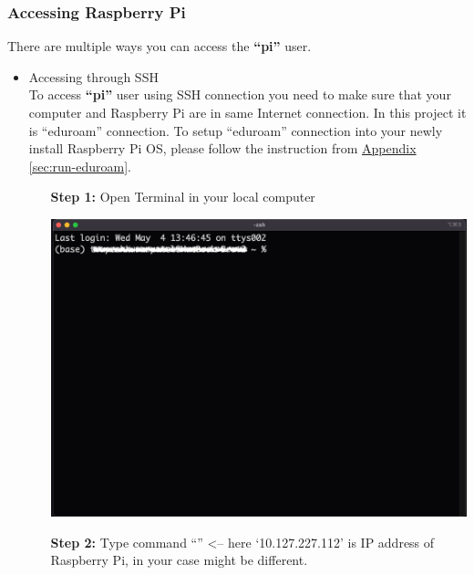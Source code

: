 	\subsubsection{Accessing Raspberry Pi}	\label{subsubsec:ssh}
		There are multiple ways you can access the \textbf{``pi''} user.  
		\begin{itemize}[leftmargin=1.2cm]
			\item Accessing through SSH \\
				To access \textbf{``pi''} user using SSH connection you need to make sure that your computer and Raspberry Pi are in same Internet connection. In this project it is ``eduroam'' connection. To setup ``eduroam'' connection into your newly install Raspberry Pi OS, please follow the instruction from \hyperref[sec:run-eduroam]{Appendix \ref{sec:run-eduroam}}.
				\begin{itemize}[leftmargin=1.3cm]
					\item[\textbf{Step 1:}] Open Terminal in your local computer \\
						\begin{minipage}{\textwidth}
							\vspace{2mm}
							\includegraphics[scale=0.18]{Images/raspberry_pi/ssh_login/open_iterm.png}
							\vspace{2mm}
						\end{minipage}
					\item[\textbf{Step 2:}] Type command ``{\selectfont{ssh pi@10.127.227.11\\2}}'' <-- here `10.127.227.112' is IP address of Raspberry Pi, in your case might be different.\\

\end{itemize}
\end{itemize}
